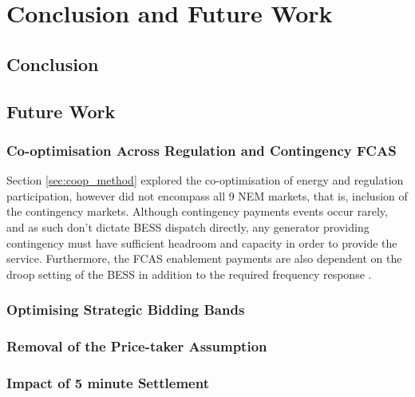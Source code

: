 \chapter{Conclusion and Future Work}
\section{Conclusion}
\section{Future Work}
\subsection{Co-optimisation Across Regulation and Contingency FCAS}
Section \ref{sec:coop_method} explored the co-optimisation of energy and regulation participation, however did not encompass all 9 NEM markets, that is, inclusion of the contingency markets. Although contingency payments events occur rarely, and as such don't dictate BESS dispatch directly, any generator providing contingency must have sufficient headroom and capacity in order to provide the service. Furthermore, the FCAS enablement payments are also dependent on the droop setting of the BESS in addition to the required frequency response \parencite{AEMO_Droop}.

\subsection{Optimising Strategic Bidding Bands}

\subsection{Removal of the Price-taker Assumption}
\subsection{Impact of 5 minute Settlement}
